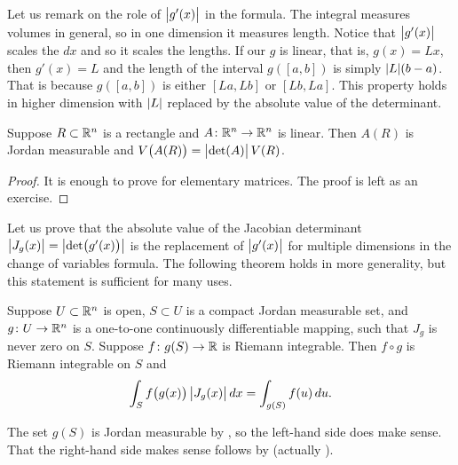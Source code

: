 Let us remark on the role of $\bigl\lvert {g'(x)} \bigr\rvert$ in the formula. 
The integral measures volumes in general, so in one dimension it measures length.
Notice that $\bigl\lvert {g'(x)} \bigr\rvert$ scales the $dx$ and
so it scales the lengths.
If our $g$ is linear, that is, $g(x)=Lx$, then
$g'(x) = L$ and the length of the interval $g([a,b])$ is simply
$\lvert {L} \rvert(b-a)$.  That is because $g([a,b])$ is either $[La,Lb]$ or
$[Lb,La]$.  This property holds in higher dimension with $\lvert {L} \rvert$ replaced
by the absolute value of the determinant.

\begin{prop} \label{prop:volrectdet}
Suppose $R \subset {\mathbb{R}}^n$ is a rectangle
and $A \colon {\mathbb{R}}^n \to {\mathbb{R}}^n$ is linear.  Then
$A(R)$ is Jordan measurable and $V\bigl(A(R)\bigr) = \bigl\lvert {\det (A)} \bigr\rvert \, V(R)$.
\end{prop}

\begin{proof}
It is enough to prove for elementary matrices.  The proof is left as an
exercise.
\end{proof}

Let us prove that
the absolute value of the Jacobian determinant
$\bigl\lvert {J_g(x)} \bigr\rvert = \bigl\lvert {\det \bigl(g'(x)\bigr)} \bigr\rvert$
is the replacement of $\bigl\lvert {g'(x)} \bigr\rvert$ for multiple
dimensions in the change of variables formula.
The following theorem holds in more generality,
but this statement is sufficient for many uses.

\begin{thm}
Suppose $U \subset {\mathbb{R}}^n$ is open,
$S \subset U$ is a compact Jordan measurable set, and
$g \colon U \to {\mathbb{R}}^n$ is a one-to-one
continuously differentiable mapping, such that
$J_g$ is never zero on $S$.
Suppose $f \colon g(S) \to {\mathbb{R}}$ is Riemann integrable.
Then $f \circ g$ is Riemann integrable on $S$ and
\begin{equation*}
\int_S f\bigl(g(x)\bigr) \, \bigl\lvert {J_g(x)} \bigr\rvert \, dx
=
\int_{g(S)} f(u) \, du . 
\end{equation*}
\end{thm}

The set $g(S)$ is Jordan measurable by ,
so the left-hand side does make sense.
That the right-hand side makes sense follows by
 (actually
).

